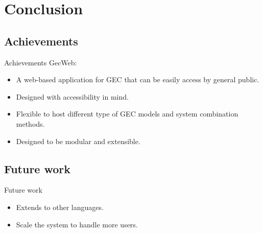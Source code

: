 \section{Conclusion}

\subsection{Achievements}
\begin{frame}{Achievements}
  GecWeb:

  \begin{itemize}
    \item A web-based application for GEC that can be easily access by general public.
    \item Designed with accessibility in mind.
    \item Flexible to host different type of GEC models and system combination methods.
    \item Designed to be modular and extensible.
  \end{itemize}
\end{frame}

\subsection{Future work}
\begin{frame}{Future work}
  \begin{itemize}
    \item Extends to other languages.
    \item Scale the system to handle more users.
  \end{itemize}
\end{frame}
